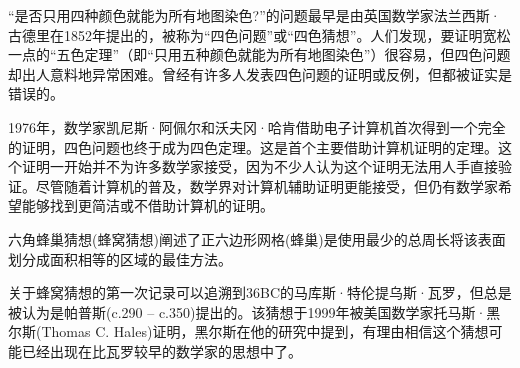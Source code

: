“是否只用四种颜色就能为所有地图染色?”的问题最早是由英国数学家法兰西斯·古德里在1852年提出的，被称为“四色问题”或“四色猜想”。人们发现，要证明宽松一点的“五色定理”（即“只用五种颜色就能为所有地图染色”）很容易，但四色问题却出人意料地异常困难。曾经有许多人发表四色问题的证明或反例，但都被证实是错误的。

1976年，数学家凯尼斯·阿佩尔和沃夫冈·哈肯借助电子计算机首次得到一个完全的证明，四色问题也终于成为四色定理。这是首个主要借助计算机证明的定理。这个证明一开始并不为许多数学家接受，因为不少人认为这个证明无法用人手直接验证。尽管随着计算机的普及，数学界对计算机辅助证明更能接受，但仍有数学家希望能够找到更简洁或不借助计算机的证明。


\begin{example}
  六角蜂巢猜想(蜂窝猜想)阐述了正六边形网格(蜂巢)是使用最少的总周长将该表面划分成面积相等的区域的最佳方法。
\end{example}

关于蜂窝猜想的第一次记录可以追溯到36BC的马库斯·特伦提乌斯·瓦罗，但总是被认为是帕普斯(c.290 – c.350)提出的。该猜想于1999年被美国数学家托马斯·黑尔斯(Thomas C. Hales)证明，黑尔斯在他的研究中提到，有理由相信这个猜想可能已经出现在比瓦罗较早的数学家的思想中了。
